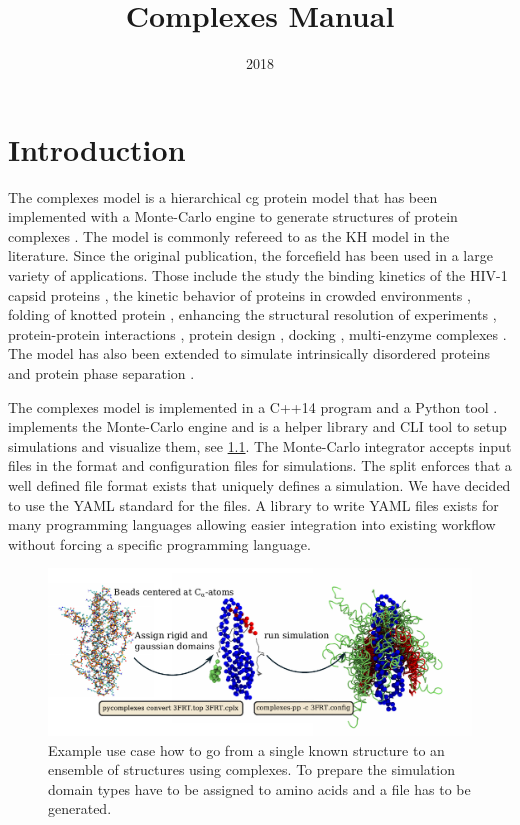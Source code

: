 \documentclass[12pt, twoside]{report}
\begin{document}
\title{Complexes Manual}
\titlepage
\date{2018}
\tableofcontents


\chapter{Introduction}
The complexes model is a hierarchical \gls{cg} protein model that has been
implemented with a Monte-Carlo engine to generate structures of protein
complexes \cite{Kim2008}. The model is commonly refereed to as the \gls{KH}
model in the literature. Since the original publication, the forcefield has been
used in a large variety of applications. Those include the study the binding
kinetics of the HIV-1 capsid proteins \cite{Zhu2015, Sha2017}, the kinetic
behavior of proteins in crowded environments \cite{Kim2013, Kim2010a, Rosen2011,
  Dignon2018a}, folding of knotted protein \cite{Skrbic2012, ABeccara2013,
  Sirur2013, Covino2014a, Sirur2016, Covino2013}, enhancing the structural
resolution of experiments \cite{Rozycki2011, Kofinger2015, Baumlova2014,
  Rozycki2015, Chalupska2017}, protein-protein interactions \cite{Okazaki2012,
  Malinverni2017, Ravikumar2012}, protein design \cite{Yadahalli2014}, docking
\cite{Fortoul2015}, multi-enzyme complexes \cite{Rozycki2017, N2018, Horan2018,
  Rozycki2016}. The model has also been extended to simulate intrinsically
disordered proteins and protein phase separation \cite{Dignon2018a}.

The complexes model is implemented in a \mbox{C++14} program \complexes and a
\mbox{Python} tool \pycomplexes. \complexes implements the Monte-Carlo engine
and \pycomplexes is a helper library and \gls{CLI} tool to setup simulations and
visualize them, see \cref{fig:toc}. The Monte-Carlo integrator accepts input
files in the \cplx format and configuration files for simulations. The split
enforces that a well defined file format exists that uniquely defines a
simulation. We have decided to use the YAML standard \cite{YAML} for the \cplx
files. A library to write YAML files exists for many programming languages
allowing easier integration into existing workflow without forcing a specific
programming language.

\begin{figure}[!ht] \centering
\includegraphics[width=\textwidth]{figures/toc}
\caption[\complexes use-case example.]{Example use case how to go from a single
known structure to an ensemble of structures using complexes. To prepare the
simulation domain types have to be assigned to amino acids and a \cplx file has
to be generated.}
\label{fig:toc}
\end{figure}
\end{document}
